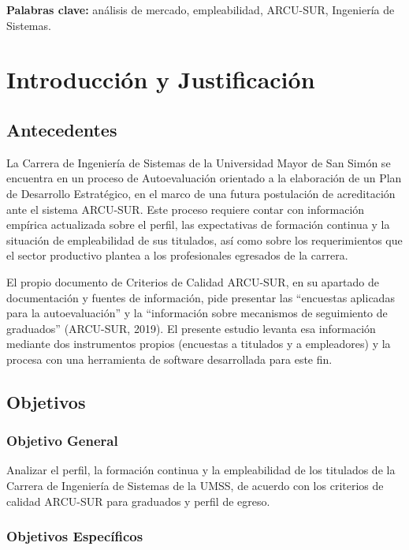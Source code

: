 \documentclass[12pt, a4paper]{article}
\begin{document}
\textbf{Palabras clave:} análisis de mercado, empleabilidad, ARCU-SUR,
Ingeniería de Sistemas.

\newpage

\setlength{\parskip}{10pt}

\section{Introducción y Justificación}

\subsection{Antecedentes}

La Carrera de Ingeniería de Sistemas de la Universidad Mayor de San Simón
se encuentra en un proceso de Autoevaluación orientado a la elaboración de
un Plan de Desarrollo Estratégico, en el marco de una futura postulación
de acreditación ante el sistema ARCU-SUR. Este proceso requiere contar con
información empírica actualizada sobre el perfil, las expectativas de
formación continua y la situación de empleabilidad de sus titulados, así
como sobre los requerimientos que el sector productivo plantea a los
profesionales egresados de la carrera.

El propio documento de Criterios de Calidad ARCU-SUR, en su apartado de
documentación y fuentes de información, pide presentar las ``encuestas
aplicadas para la autoevaluación'' y la ``información sobre mecanismos
de seguimiento de graduados'' (ARCU-SUR, 2019). El presente estudio
levanta esa información mediante dos instrumentos propios (encuestas a
titulados y a empleadores) y la procesa con una herramienta de software
desarrollada para este fin.

\subsection{Objetivos}

\subsubsection{Objetivo General}

Analizar el perfil, la formación continua y la empleabilidad de los
titulados de la Carrera de Ingeniería de Sistemas de la UMSS, de acuerdo
con los criterios de calidad ARCU-SUR para graduados y perfil de egreso.

\subsubsection{Objetivos Específicos}
\end{document}
